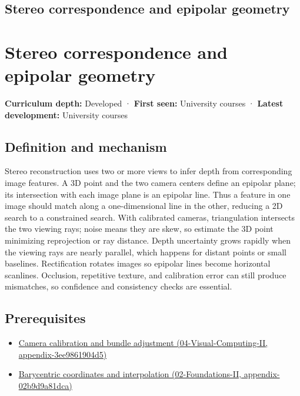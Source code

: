 \hypertarget{appendix-c4e98b6e4001}{}
\section*{Stereo correspondence and epipolar geometry}
\chapter{Stereo correspondence and epipolar geometry}\label{appendix-c4e98b6e4001-stereo-correspondence-and-epipolar-geometry}

\textbf{Curriculum depth:} Developed · \textbf{First seen:} University courses · \textbf{Latest development:} University courses

\section{Definition and mechanism}\label{appendix-c4e98b6e4001-definition-and-mechanism}

Stereo reconstruction uses two or more views to infer depth from corresponding image features. A 3D point and the two camera centers define an epipolar plane; its intersection with each image plane is an epipolar line. Thus a feature in one image should match along a one-dimensional line in the other, reducing a 2D search to a constrained search. With calibrated cameras, triangulation intersects the two viewing rays; noise means they are skew, so estimate the 3D point minimizing reprojection or ray distance. Depth uncertainty grows rapidly when the viewing rays are nearly parallel, which happens for distant points or small baselines. Rectification rotates images so epipolar lines become horizontal scanlines. Occlusion, repetitive texture, and calibration error can still produce mismatches, so confidence and consistency checks are essential.

\section{Prerequisites}\label{appendix-c4e98b6e4001-prerequisites}

\begin{itemize}
\tightlist
\item
  \href{../04-Visual-Computing-II/main.pdf\#nameddest=appendix-3ee9861904d5}{Camera calibration and bundle adjustment (04-Visual-Computing-II, appendix-3ee9861904d5)}
\item
  \href{../02-Foundations-II/main.pdf\#nameddest=appendix-02b9d9a81dca}{Barycentric coordinates and interpolation (02-Foundations-II, appendix-02b9d9a81dca)}
\end{itemize}

